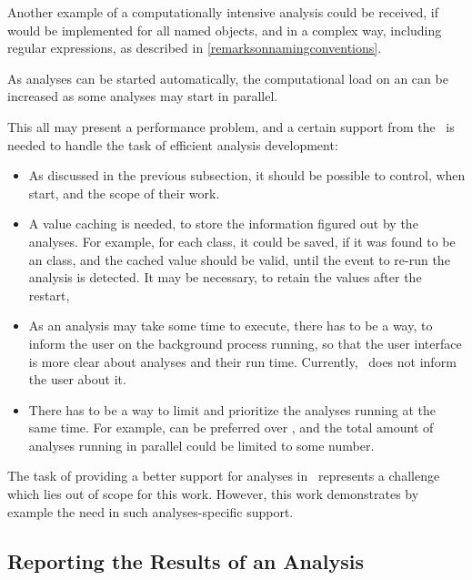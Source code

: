 Another example of a computationally intensive analysis could be received, if   would
be implemented for all named objects, and in a complex way, including regular expressions, as described in \ref{remarksonnamingconventions}.

As analyses can be started automatically, the computational load on an  can be increased as some analyses
may start in parallel. 

This all may present a performance problem, and a certain support from the \jbmps\ is needed to handle the task
of efficient analysis development:

\begin{itemize}
 \item As discussed in the previous subsection, it should be possible to control, when  start,
and the scope of their work. 


\item A value caching is needed, to store the information figured out by the analyses. For example, for each
class, it could be saved, if it was found to be an  class, and the cached value should be valid, until
the event to re-run the analysis is detected. It may be necessary, to retain the values after the  restart,

 \item As an analysis may take some time to execute, there has to be a way, to inform the user on the background process
running, so that the user interface is more clear about analyses and their run time. Currently, \jbmps\ does not inform
the user about it.

\item There has to be a way to limit and prioritize the analyses running at the same time. For example, 
can be preferred over , and the total amount of analyses running in parallel could be limited 
to some number.

\end{itemize}

The task of providing a better support for analyses in \jbmps\ represents a challenge which lies out of scope for this work.
However, this work demonstrates by example the need in such analyses-specific support.

\subsection{Reporting the Results of an Analysis}
\label{reportinganalysis}

